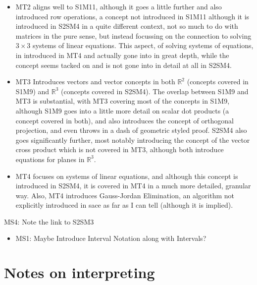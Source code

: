 \documentclass[twoside,12pt,a4paper]{report}
\begin{document}
\begin{itemize}
\begin{itemize}
			\item MT2 aligns well to S1M11, although it goes a little further and also introduced row operations, a concept not introduced in S1M11 although it is introduced in S2SM4 in a quite different context, not so much to do with matrices in the pure sense, but instead focussing on the connection to solving $3 \times 3$ systems of linear equations. This aspect, of solving systems of equations, in introduced in MT4 and actually gone into in great depth, while the concept seems tacked on and is not gone into in detail at all in S2SM4.
			\item MT3 Introduces vectors and vector concepts in both $\mathbb{R}^2$ (concepts covered in S1M9) and $\mathbb{R}^3$ (concepts covered in S2SM4). The overlap between S1M9 and MT3 is substantial, with MT3 covering most of the concepts in S1M9, although S1M9 goes into a little more detail on scalar dot products (a concept covered in both), and also introduces the concept of orthogonal projection, and even throws in a dash of geometric styled proof. S2SM4 also goes significantly further, most notably introducing the concept of the vector cross product which is not covered in MT3, although both introduce equations for planes in $\mathbb{R}^3$.
			\item MT4 focuses on systems of linear equations, and although this concept is introduced in S2SM4, it is covered in MT4 in a much more detailed, granular way. Also, MT4 introduces Gauss-Jordan Elimination, an algorithm not explicitly introduced in \gls{sace} as far as I can tell (although it is implied).
		\end{itemize}
\end{itemize}


MS4: Note the link to S2SM3 

\begin{itemize}
	\item MS1: Maybe Introduce Interval Notation along with Intervals?
\end{itemize}


\section{Notes on interpreting }
\end{document}
